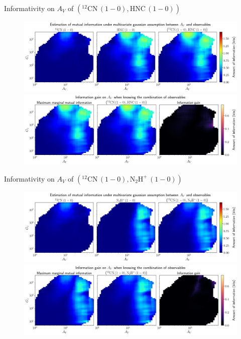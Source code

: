 \documentclass{beamer}
\begin{document}
\begin{frame}{Informativity on $A_V$ of $\left(\mathrm{^{12}CN\,(1-0)},\mathrm{HNC\,(1-0)}\right)$}
    \begin{figure}
        \centering
        \includegraphics[width=0.95\linewidth]{../linearinfo/av__12cn10_hnc10_linearinfo.png}
        \vfill
        \includegraphics[width=0.95\linewidth]{../linearinfo/av__12cn10_hnc10_linearinfo_gain.png}
    \end{figure}
\end{frame}

\begin{frame}{Informativity on $A_V$ of $\left(\mathrm{^{12}CN\,(1-0)},\mathrm{N_2H^+\,(1-0)}\right)$}
    \begin{figure}
        \centering
        \includegraphics[width=0.95\linewidth]{../linearinfo/av__12cn10_n2hp10_linearinfo.png}
        \vfill
        \includegraphics[width=0.95\linewidth]{../linearinfo/av__12cn10_n2hp10_linearinfo_gain.png}
    \end{figure}
\end{frame}
\end{document}
